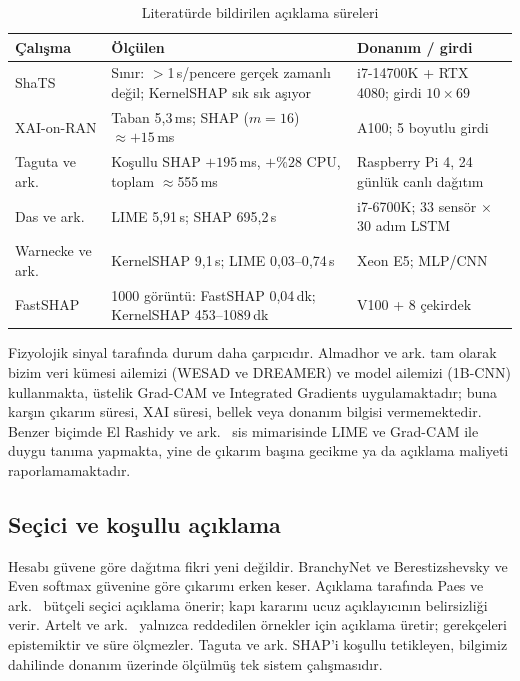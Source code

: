 \documentclass[conference]{IEEEtran}
\newcommand{\ms}{\,ms\xspace}
\begin{document}
\begin{table}[t]
\caption{Literatürde bildirilen açıklama süreleri}
\label{tab:lit-maliyet}
\centering
\small
\begin{tabular}{p{2.1cm}p{2.4cm}p{2.7cm}}
\toprule
\textbf{Çalışma} & \textbf{Ölçülen} & \textbf{Donanım / girdi}\\
\midrule
ShaTS \cite{shats2025} & Sınır: $>$1\,s/pencere gerçek zamanlı değil; KernelSHAP sık sık aşıyor & i7-14700K + RTX 4080; girdi $10\times69$\\
XAI-on-RAN \cite{basaran2025} & Taban 5{,}3\ms; SHAP ($m{=}16$) $\approx +15$\ms & A100; 5 boyutlu girdi\\
Taguta ve ark. \cite{taguta2026} & Koşullu SHAP $+195$\ms, $+\%28$ CPU, toplam $\approx$555\ms & Raspberry Pi 4, 24 günlük canlı dağıtım\\
Das ve ark. \cite{das2021} & LIME 5{,}91\,s; SHAP 695{,}2\,s & i7-6700K; 33 sensör $\times$ 30 adım LSTM\\
Warnecke ve ark. \cite{warnecke2020} & KernelSHAP 9{,}1\,s; LIME 0{,}03--0{,}74\,s & Xeon E5; MLP/CNN\\
FastSHAP \cite{jethani2022} & 1000 görüntü: FastSHAP 0{,}04\,dk; KernelSHAP 453--1089\,dk & V100 + 8 çekirdek\\
\bottomrule
\end{tabular}
\end{table}

Fizyolojik sinyal tarafında durum daha çarpıcıdır. Almadhor ve ark.
\cite{almadhor2025} tam olarak bizim veri kümesi ailemizi (WESAD ve DREAMER) ve
model ailemizi (1B-CNN) kullanmakta, üstelik Grad-CAM ve Integrated Gradients
uygulamaktadır; buna karşın çıkarım süresi, XAI süresi, bellek veya donanım
bilgisi vermemektedir. Benzer biçimde El Rashidy ve ark.\ \cite{elrashidy2025}
sis mimarisinde LIME ve Grad-CAM ile duygu tanıma yapmakta, yine de çıkarım
başına gecikme ya da açıklama maliyeti raporlamamaktadır.

\subsection{Seçici ve koşullu açıklama}

Hesabı güvene göre dağıtma fikri yeni değildir. BranchyNet \cite{teerapittayanon2017}
ve Berestizshevsky ve Even \cite{berestizshevsky2018} softmax güvenine göre
çıkarımı erken keser. Açıklama tarafında Paes ve ark.\ \cite{paes2024} bütçeli
seçici açıklama önerir; kapı kararını ucuz açıklayıcının belirsizliği verir.
Artelt ve ark.\ \cite{artelt2023} yalnızca reddedilen örnekler için açıklama
üretir; gerekçeleri epistemiktir ve süre ölçmezler. Taguta ve ark.
\cite{taguta2026} SHAP'i koşullu tetikleyen, bilgimiz dahilinde donanım üzerinde
ölçülmüş tek sistem çalışmasıdır.
\end{document}
